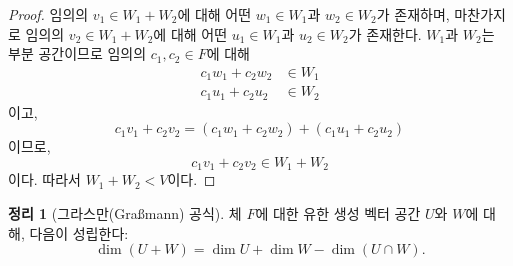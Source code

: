\documentclass[unfonts,oneside,a4paper]{oblivoir}
\theoremstyle{definition}
\theoremstyle{theorem}
\newtheorem{theorem}{정리}
\theoremstyle{remark}
\theoremstyle{remark}
\theoremstyle{remark}
\theoremstyle{remark}
\renewcommand{\vec}[1]{\bm{\mathit{#1}}}
\begin{document}
\begin{proof}
    임의의 $\vec v_1 \in W_1 + W_2$에 대해 어떤 $\vec w_1 \in W_1$과 $\vec w_2 \in W_2$가 존재하며, 마찬가지로 임의의 $\vec v_2 \in W_1 + W_2$에 대해 어떤 $\vec u_1 \in W_1$과 $\vec u_2 \in W_2$가 존재한다.
    $W_1$과 $W_2$는 부분 공간이므로 임의의 $c_1, c_2 \in F$에 대해
    \begin{align*}
        c_1 \vec w_1 + c_2 \vec w_2 &\in W_1\\
        c_1 \vec u_1 + c_2 \vec u_2 &\in W_2
    \end{align*}
    이고,
    \begin{equation*}
        c_1 \vec v_1 + c_2 \vec v_2 = (c_1 \vec w_1 + c_2 \vec w_2) + (c_1 \vec u_1 + c_2 \vec u_2)
    \end{equation*}
    이므로,
    \begin{equation*}
        c_1 \vec v_1 + c_2 \vec v_2 \in W_1 + W_2
    \end{equation*}
    이다.
    따라서 $W_1 + W_2 < V$이다.
\end{proof}

\begin{theorem}[그라스만(Graßmann) 공식] \label{thm:grassmann}
    체 $F$에 대한 유한 생성 벡터 공간 $U$와 $W$에 대해, 다음이 성립한다:
    \begin{equation*}
        \dim (U + W) = \dim U + \dim W - \dim (U \cap W).
    \end{equation*}
\end{theorem}
\end{document}
